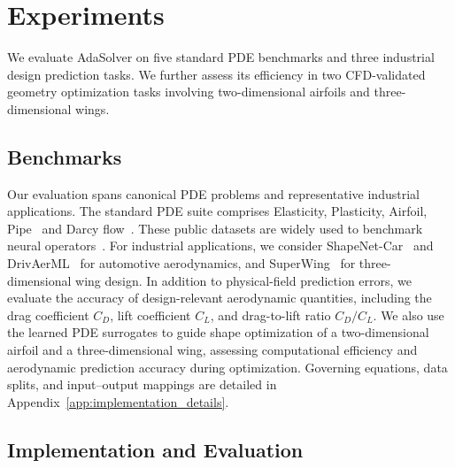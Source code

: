 \documentclass{article}
\begin{document}
\section{Experiments}
\label{sec:experiments}

We evaluate AdaSolver on five standard PDE benchmarks and three industrial design prediction tasks. We further assess its efficiency in two CFD-validated geometry optimization tasks involving two-dimensional airfoils and three-dimensional wings.

\subsection{Benchmarks}
\label{sec:experiment_benchmarks}

Our evaluation spans canonical PDE problems and representative industrial applications. The standard PDE suite comprises Elasticity, Plasticity, Airfoil, Pipe~\citep{li2023geofno} and Darcy flow~\citep{li2021fno}. These public datasets are widely used to benchmark neural operators~\citep{hao2023gnot,wu2024transolver}. 
For industrial applications, we consider ShapeNet-Car~\citep{umetani2018learning} and DrivAerML~\citep{ashton2024drivaerml} for automotive aerodynamics, and SuperWing~\citep{yang2025superwing} for three-dimensional wing design. In addition to physical-field prediction errors, we evaluate the accuracy of design-relevant aerodynamic quantities, including the drag coefficient $C_D$, lift coefficient $C_L$, and drag-to-lift ratio $C_D/C_L$. We also use the learned PDE surrogates to guide shape optimization of a two-dimensional airfoil and a three-dimensional wing, assessing computational efficiency and aerodynamic prediction accuracy during optimization. Governing equations, data splits, and input--output mappings are detailed in Appendix~\ref{app:implementation_details}.


\subsection{Implementation and Evaluation}
\label{sec:experiment_implementation}
\end{document}
